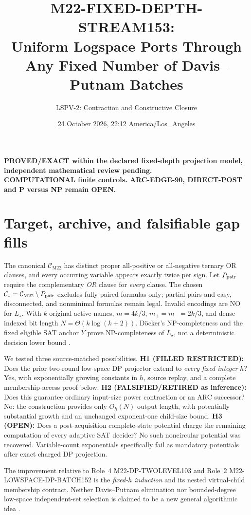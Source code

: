 \documentclass[11pt]{article}
\title{M22-FIXED-DEPTH-STREAM153:\\ Uniform Logspace Ports Through Any Fixed Number of Davis--Putnam Batches}
\author{LSPV-2: Contraction and Constructive Closure}
\date{24 October 2026, 22:12 America/Los\_Angeles}
\newcommand{\CM}{\mathcal C_{\mathrm{M22}}}
\newcommand{\CS}{\mathcal C_{\star}}
\begin{document}
\maketitle
\begin{center}
\textbf{PROVED/EXACT within the declared fixed-depth projection model, independent mathematical review pending.}\\
\textbf{COMPUTATIONAL finite controls. ARC-EDGE-90, DIRECT-POST and P versus NP remain OPEN.}
\end{center}

\section{Target, archive, and falsifiable gap fills}
The canonical \(\CM\) has distinct proper all-positive or all-negative ternary OR clauses, and every occurring variable appears exactly twice per sign.  Let \(P_{\rm pair}\) require the complementary \emph{OR} clause for \emph{every} clause.  The chosen \(\CS=\CM\setminus P_{\rm pair}\) excludes fully paired formulas only; partial pairs and easy, disconnected, and nonminimal formulas remain legal.  Invalid encodings are NO for \(L_\star\).  With \(k\) original active names, \(m=4k/3\), \(m_+=m_-=2k/3\), and dense indexed bit length \(N=\Theta(k\log(k+2))\).  D\"ocker's NP-completeness and the fixed eligible SAT anchor \(Y\) prove NP-completeness of \(L_\star\), not a deterministic decision lower bound \cite{docker}.

We tested three source-matched possibilities. \textbf{H1 (FILLED RESTRICTED):} Does the prior two-round low-space DP projector extend to \emph{every fixed integer} \(h\)? Yes, with exponentially growing constants in \(h\), source replay, and a complete membership-access proof below. \textbf{H2 (FALSIFIED/RETIRED as inference):} Does this guarantee ordinary input-size power contraction or an ARC successor? No: the construction provides only \(O_h(N)\) output length, with potentially substantial growth and an unchanged exponent-one child-size bound. \textbf{H3 (OPEN):} Does a post-acquisition complete-state potential charge the remaining computation of every adaptive SAT decider? No such noncircular potential was recovered.  Variable-count exponentials specifically fail as mandatory potentials after exact charged DP projection.

The improvement relative to Role~4 M22-DP-TWOLEVEL103 and Role~2 M22-LOWSPACE-DP-BATCH152 is the \emph{fixed-\(h\) induction} and its nested virtual-child membership contract.  Neither Davis--Putnam elimination nor bounded-degree low-space independent-set selection is claimed to be a new general algorithmic idea \cite{dp,biswas}.
\end{document}
